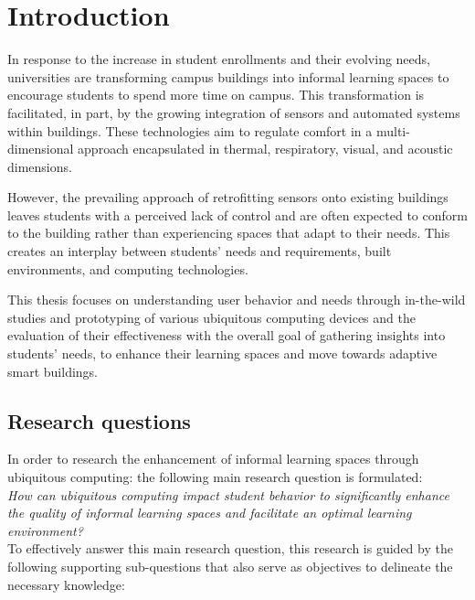 \section{Introduction}
In response to the increase in student enrollments and their evolving needs, universities are transforming campus buildings into informal learning spaces to encourage students to spend more time on campus. This transformation is facilitated, in part, by the growing integration of sensors and automated systems within buildings. These technologies aim to regulate comfort in a multi-dimensional approach encapsulated in thermal, respiratory, visual, and acoustic dimensions.

However, the prevailing approach of retrofitting sensors onto existing buildings leaves students with a perceived lack of control and are often expected to conform to the building rather than experiencing spaces that adapt to their needs. This creates an interplay between students' needs and requirements, built environments, and computing technologies.

This thesis focuses on understanding user behavior and needs through in-the-wild studies and prototyping of various ubiquitous computing devices and the evaluation of their effectiveness with the overall goal of gathering insights into students' needs, to enhance their learning spaces and move towards adaptive smart buildings.

\subsection{Research questions}

In order to research the enhancement of informal learning spaces through ubiquitous computing:  the following main research question is formulated: \\

\emph{How can ubiquitous computing impact student behavior to significantly enhance the quality of informal learning spaces and facilitate an optimal learning environment?} \\

To effectively answer this main research question, this research is guided by the following supporting sub-questions that also serve as objectives to delineate the necessary knowledge: \\


